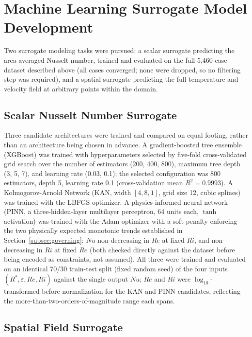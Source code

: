 \section{Machine Learning Surrogate Model Development}
\label{sec:ml}

Two surrogate modeling tasks were pursued: a scalar surrogate predicting the area-averaged Nusselt number, trained and evaluated on the full 5,460-case dataset described above (all cases converged; none were dropped, so no filtering step was required), and a spatial surrogate predicting the full temperature and velocity field at arbitrary points within the domain.

\subsection{Scalar Nusselt Number Surrogate}
\label{subsec:scalar_arch}

Three candidate architectures were trained and compared on equal footing, rather than an architecture being chosen in advance. A gradient-boosted tree ensemble (XGBoost) was trained with hyperparameters selected by five-fold cross-validated grid search over the number of estimators (200, 400, 800), maximum tree depth (3, 5, 7), and learning rate (0.03, 0.1); the selected configuration was 800 estimators, depth 5, learning rate 0.1 (cross-validation mean $R^2=0.9993$). A Kolmogorov-Arnold Network (KAN, width $[4,8,1]$, grid size 12, cubic splines) was trained with the LBFGS optimizer. A physics-informed neural network (PINN, a three-hidden-layer multilayer perceptron, 64 units each, $\tanh$ activation) was trained with the Adam optimizer with a soft penalty enforcing the two physically expected monotonic trends established in Section~\ref{subsec:governing}: $Nu$ non-decreasing in $Re$ at fixed $Ri$, and non-decreasing in $Ri$ at fixed $Re$ (both checked directly against the dataset before being encoded as constraints, not assumed). All three were trained and evaluated on an identical 70/30 train-test split (fixed random seed) of the four inputs $(R^\ast, \varepsilon, Re, Ri)$ against the single output $Nu$; $Re$ and $Ri$ were $\log_{10}$-transformed before normalization for the KAN and PINN candidates, reflecting the more-than-two-orders-of-magnitude range each spans.

\subsection{Spatial Field Surrogate}
\label{subsec:field_arch}

